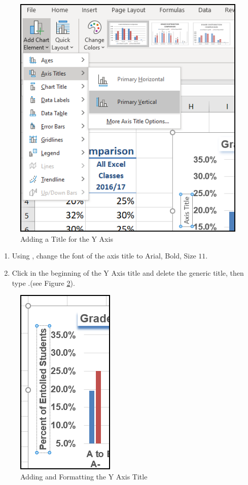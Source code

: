 \begin{figure}[H]
	\centering
	\includegraphics[width=\maxwidth{.95\linewidth}]{gfx/ch04_fig34}
	\caption{Adding a Title for the Y Axis}
	\label{04:fig34}
\end{figure}

\begin{enumerate}
	\item Using , change the font of the axis title to Arial, Bold, Size $ 11 $.
	\item Click in the beginning of the Y Axis title and delete the generic title, then type .(see Figure \ref{04:fig35}).
\end{enumerate}

\begin{figure}[H]
	\centering
	\includegraphics[width=\maxwidth{.95\linewidth}]{gfx/ch04_fig35}
	\caption{Adding and Formatting the Y Axis Title}
	\label{04:fig35}
\end{figure}

